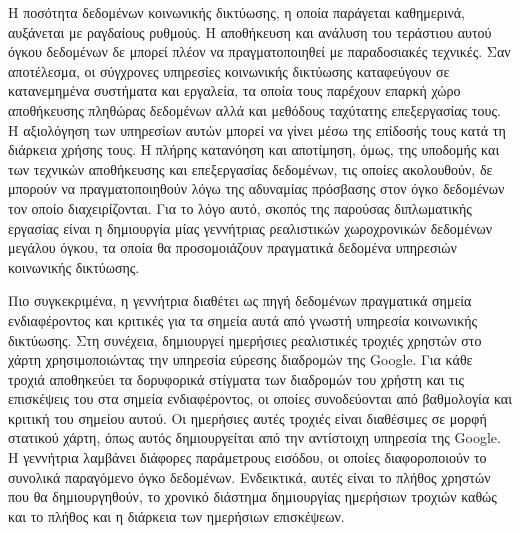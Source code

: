 
\begin{abstractgr}%

Η ποσότητα δεδομένων κοινωνικής δικτύωσης, η οποία παράγεται καθημερινά, αυξάνεται με ραγδαίους ρυθμούς. Η αποθήκευση και ανάλυση του τεράστιου αυτού όγκου δεδομένων 
δε μπορεί πλέον να πραγματοποιηθεί με παραδοσιακές τεχνικές. Σαν αποτέλεσμα, οι σύγχρονες υπηρεσίες κοινωνικής δικτύωσης καταφεύγουν σε κατανεμημένα συστήματα και εργαλεία, 
τα οποία τους \linebreak παρέχουν επαρκή χώρο αποθήκευσης πληθώρας δεδομένων αλλά και μεθόδους ταχύτατης \linebreak επεξεργασίας τους. Η αξιολόγηση των υπηρεσίων αυτών μπορεί να γίνει 
μέσω της επίδοσής τους κατά τη διάρκεια χρήσης τους. Η πλήρης κατανόηση και αποτίμηση, όμως, της υποδομής και των τεχνικών αποθήκευσης και επεξεργασίας δεδομένων, τις 
οποίες ακολουθούν, δε μπορούν να πραγματοποιηθούν λόγω της αδυναμίας πρόσβασης στον όγκο δεδομένων τον οποίο διαχειρίζονται. Για το λόγο αυτό, σκοπός της 
παρούσας διπλωματικής εργασίας είναι η δημιουργία μίας γεννήτριας ρεαλιστικών \linebreak χωροχρονικών δεδομένων μεγάλου όγκου, τα οποία θα προσομοιάζουν πραγματικά δεδομένα 
\linebreak υπηρεσιών κοινωνικής δικτύωσης. 

Πιο συγκεκριμένα, η γεννήτρια διαθέτει ως πηγή δεδομένων πραγματικά σημεία ενδιαφέροντος και κριτικές για τα σημεία αυτά από γνωστή υπηρεσία κοινωνικής δικτύωσης. 
Στη συνέχεια, \linebreak δημιουργεί ημερήσιες ρεαλιστικές τροχιές χρηστών στο χάρτη χρησιμοποιώντας την υπηρεσία \linebreak εύρεσης διαδρομών της Google. Για κάθε τροχιά αποθηκεύει 
τα δορυφορικά στίγματα των διαδρομών του χρήστη και τις επισκέψεις του στα σημεία ενδιαφέροντος, οι οποίες συνοδεύονται από βαθμολογία και κριτική του σημείου αυτού. 
Οι ημερήσιες αυτές τροχιές είναι διαθέσιμες σε μορφή στατικού χάρτη, όπως αυτός δημιουργείται από την αντίστοιχη υπηρεσία της Google. Η γεννήτρια λαμβάνει διάφορες 
παράμετρους εισόδου, οι οποίες διαφοροποιούν το συνολικά παραγόμενο όγκο δεδομένων. Ενδεικτικά, αυτές είναι το πλήθος χρηστών που θα δημιουργηθούν, το 
χρονικό διάστημα δημιουργίας ημερήσιων τροχιών καθώς και το πλήθος και η διάρκεια των ημερήσιων επισκέψεων. 


\end{abstractgr}
